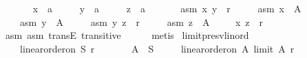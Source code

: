 \begin{isabellebody}
\ \ \isamarkupfalse%
\isanewline
\ \ \ \ x\ {\isacharcolon}{\kern0pt}{\isacharcolon}{\kern0pt}\ {\isachardoublequoteopen}{\isacharprime}{\kern0pt}a{\isachardoublequoteclose}\ \isanewline
\ \ \ \ y\ {\isacharcolon}{\kern0pt}{\isacharcolon}{\kern0pt}\ {\isachardoublequoteopen}{\isacharprime}{\kern0pt}a{\isachardoublequoteclose}\ \isanewline
\ \ \ \ z\ {\isacharcolon}{\kern0pt}{\isacharcolon}{\kern0pt}\ {\isachardoublequoteopen}{\isacharprime}{\kern0pt}a{\isachardoublequoteclose}\isanewline
\ \ \isamarkupfalse%
\isanewline
\ \ \ \ asm{}{\isacharcolon}{\kern0pt}\ {\isachardoublequoteopen}{\isacharparenleft}{\kern0pt}x{\isacharcomma}{\kern0pt}\ y{\isacharparenright}{\kern0pt}\ {\isasymin}\ r{\isachardoublequoteclose}\ \isanewline
\ \ \ \ asm{}{\isacharcolon}{\kern0pt}\ {\isachardoublequoteopen}x\ {\isasymin}\ A{\isachardoublequoteclose}\ \isanewline
\ \ \ \ asm{}{\isacharcolon}{\kern0pt}\ {\isachardoublequoteopen}y\ {\isasymin}\ A{\isachardoublequoteclose}\ \isanewline
\ \ \ \ asm{}{\isacharcolon}{\kern0pt}\ {\isachardoublequoteopen}{\isacharparenleft}{\kern0pt}y{\isacharcomma}{\kern0pt}\ z{\isacharparenright}{\kern0pt}\ {\isasymin}\ r{\isachardoublequoteclose}\ \isanewline
\ \ \ \ asm{}{\isacharcolon}{\kern0pt}\ {\isachardoublequoteopen}z\ {\isasymin}\ A{\isachardoublequoteclose}\isanewline
\ \ \isamarkupfalse%
\ \ {\isachardoublequoteopen}{\isacharparenleft}{\kern0pt}x{\isacharcomma}{\kern0pt}\ z{\isacharparenright}{\kern0pt}\ {\isasymin}\ r{\isachardoublequoteclose}\isanewline
\ \ \ \ \isamarkupfalse%
\ asm{}\ asm{}\ transE\ transitive\isanewline
\ \ \ \ \isamarkupfalse%
\ metis\isanewline
{}\isamarkupfalse%
%
\endisatagproof
{\isafoldproof}%
%
\isadelimproof
\isanewline
%
\endisadelimproof
\isanewline
{}\isamarkupfalse%
\ limit{\isacharunderscore}{\kern0pt}presv{\isacharunderscore}{\kern0pt}lin{\isacharunderscore}{\kern0pt}ord{\isacharcolon}{\kern0pt}\isanewline
\ \ \isanewline
\ \ \ \ {\isachardoublequoteopen}linear{\isacharunderscore}{\kern0pt}order{\isacharunderscore}{\kern0pt}on\ S\ r{\isachardoublequoteclose}\ \isanewline
\ \ \ \ \ \ {\isachardoublequoteopen}A\ {\isasymsubseteq}\ S{\isachardoublequoteclose}\isanewline
\ \ \ \ \ {\isachardoublequoteopen}linear{\isacharunderscore}{\kern0pt}order{\isacharunderscore}{\kern0pt}on\ A\ {\isacharparenleft}{\kern0pt}limit\ A\ r{\isacharparenright}{\kern0pt}{\isachardoublequoteclose}\isanewline

\end{isabellebody}
